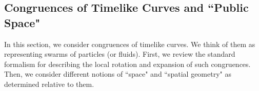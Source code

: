 \documentclass [12] {article}
\theoremstyle{plain}
\numberwithin{figure}{subsection}
\numberwithin{proposition}{subsection}
\begin{document}
\subsection{Congruences of Timelike Curves and ``Public Space"}

In this section, we consider congruences of timelike curves. We think of them as representing swarms of particles (or fluids).  First, we review the standard formalism for describing the local rotation and expansion of such congruences. Then, we consider different notions of ``space" and ``spatial geometry" as determined relative to them.  


\end{document}
